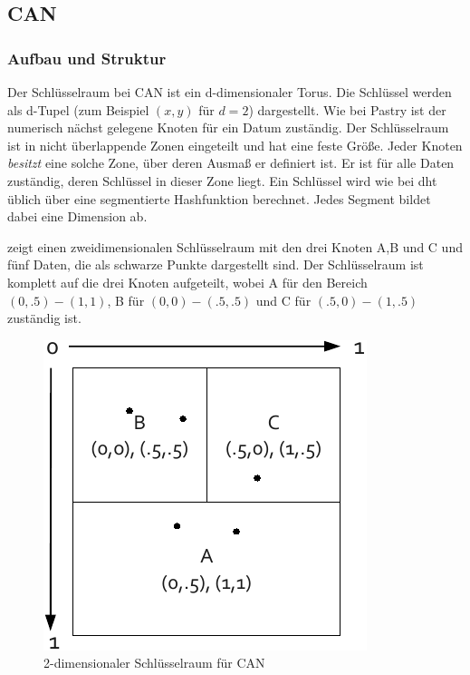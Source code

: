 \subsection{CAN}
\label{chap:evaluation_can}

\subsubsection{Aufbau und Struktur}
Der Schlüsselraum bei CAN \cite{Ratnasamy2001Scalable} ist ein d-dimensionaler Torus. Die Schlüssel werden als d-Tupel (zum Beispiel $(x,y)$ für $d=2$) dargestellt. Wie bei Pastry ist der numerisch nächst gelegene Knoten für ein Datum zuständig. Der Schlüsselraum ist in nicht überlappende Zonen eingeteilt und hat eine feste Größe. Jeder Knoten \emph{besitzt} eine solche Zone, über deren Ausmaß er definiert ist. Er ist für alle Daten zuständig, deren Schlüssel in dieser Zone liegt. Ein Schlüssel wird wie bei \ac{dht} üblich über eine segmentierte Hashfunktion berechnet. Jedes Segment bildet dabei eine Dimension ab.

 zeigt einen zweidimensionalen Schlüsselraum mit den drei Knoten A,B und C und fünf Daten, die als schwarze Punkte dargestellt sind. Der Schlüsselraum ist komplett auf die drei Knoten aufgeteilt, wobei A für den Bereich $(0, .5)-(1, 1)$, B für $(0, 0)-(.5, .5)$ und C für $(.5, 0)-(1, .5)$ zuständig ist.

\begin{figure}[htbp]
\centering
\includegraphics{grafics/can_key_space.pdf}
\caption{2-dimensionaler Schlüsselraum für CAN}
\label{fig:can_key_space}
\end{figure}

